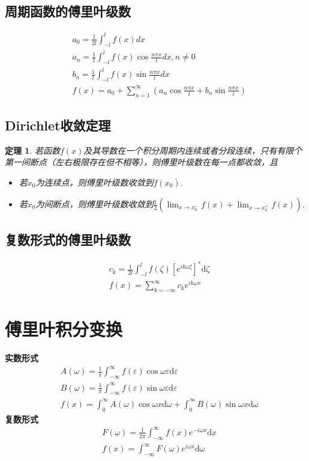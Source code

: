 \documentclass[11pt, a4paper, twoside]{ctexbook}
\newtheorem{theorem}{定理}[section]
\begin{document}
\subsection{周期函数的傅里叶级数}
$$\begin{aligned}
    &a_0 = \frac{1}{2l} \int_{-l}^l f(x)dx\\
    &a_n = \frac{1}{l}\int_{-l}^l f(x)\cos \frac{n\pi x}{l} dx, n \ne 0\\
    &b_n = \frac{1}{l}\int_{-l}^l f(x)\sin \frac{n\pi x}{l} dx\\
    &f(x) = a_0 + \sum_{n= 1}^{\infty}(a_n \cos\frac{n \pi x}{l} + b_n \sin \frac{n \pi x}{l})
\end{aligned}$$
\subsection{Dirichlet收敛定理}
\begin{theorem}
    若函数$f(x)$及其导数在一个积分周期内连续或者分段连续，只有有限个第一间断点（左右极限存在但不相等），则傅里叶级数在每一点都收敛，且
\begin{itemize}
    \item 若$x_0$为连续点，则傅里叶级数收敛到$f(x_0)$.
    \item 若$x_0$为间断点，则傅里叶级数收敛到$\frac{1}{2}(\lim_{x\to x_0^-}f(x) + \lim_{x\to x_0^+}f(x)).$
\end{itemize}
\end{theorem}
\subsection{复数形式的傅里叶级数}
$$\begin{aligned}
    &c_k = \frac{1}{2l}\int_{-l}^lf(\zeta)[e^{ik\omega\zeta}]^*\mathrm{d}\zeta\\
    &f(x) = \sum_{k = -\infty}^{\infty}c_ke^{ik\omega x}
\end{aligned}$$
\section{傅里叶积分变换}
\textbf{实数形式}
$$\begin{aligned}
    &A(\omega)= \frac{1}{\pi}\int_{-\infty}^{\infty}f(\varepsilon)\cos \omega \varepsilon \mathrm{d}\varepsilon\\
    &B(\omega)= \frac{1}{\pi}\int_{-\infty}^{\infty}f(\varepsilon)\sin \omega \varepsilon \mathrm{d}\varepsilon\\
    &f(x) = \int_0^{\infty}A(\omega)\cos \omega x \mathrm{d}\omega + \int_0^{\infty}B(\omega)\sin \omega x \mathrm{d}\omega
\end{aligned}$$
\textbf{复数形式}
$$\begin{aligned}
    &F(\omega) = \frac{1}{2\pi}\int_{-\infty}^{\infty}f(x)e^{-i\omega x}\mathrm{d}x\\
    &f(x) = \int_{-\infty}^{\infty}F(\omega)e^{i\omega x}\mathrm{d}\omega
\end{aligned}$$
\end{document}

